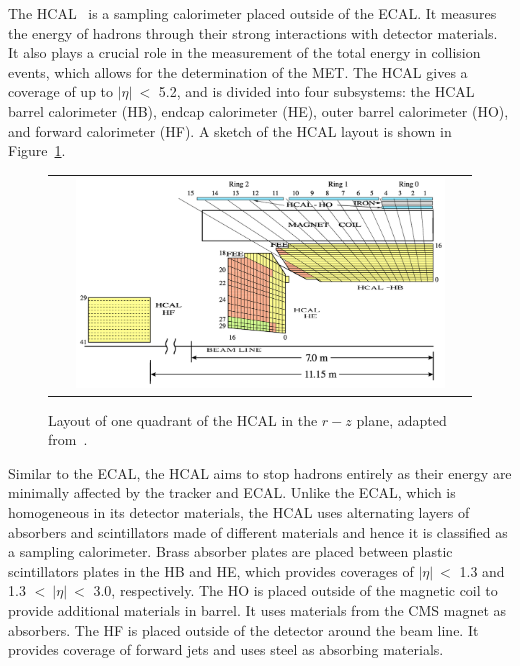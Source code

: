 The \ac{HCAL}~\cite{CMS:1997xji} is a sampling calorimeter placed outside of the \ac{ECAL}. It measures the energy of hadrons through their strong interactions with detector materials. It also plays a crucial role in the measurement of the total energy in collision events, which allows for the determination of the \ac{MET}. The \ac{HCAL} gives a coverage of up to $|\eta|~<$ 5.2, and is divided into four subsystems: the \ac{HCAL} barrel calorimeter (HB), endcap calorimeter (HE), outer barrel calorimeter (HO), and forward calorimeter (HF). A sketch of the \ac{HCAL} layout is shown in Figure~\ref{fig:HCAL}.

\begin{figure}[tbh!]
 \begin{center}
 \begin{tabular}{c}
 \includegraphics[width=0.9\textwidth]{figures/Part2/CMS/HCAL}
 \end{tabular}
 \caption{Layout of one quadrant of the \ac{HCAL} in the $r-z$ plane, adapted from~\cite{CMS:2009nwd}.}
 \label{fig:HCAL}
 \end{center}
\end{figure}

Similar to the \ac{ECAL}, the \ac{HCAL} aims to stop hadrons entirely as their energy are minimally affected by the tracker and \ac{ECAL}. Unlike the \ac{ECAL}, which is homogeneous in its detector materials, the \ac{HCAL} uses alternating layers of absorbers and scintillators made of different materials and hence it is classified as a sampling calorimeter. Brass absorber plates are placed between plastic scintillators plates in the HB and HE, which provides coverages of $|\eta|~<$ 1.3 and 1.3 $<~|\eta|~<$ 3.0, respectively. The HO is placed outside of the magnetic coil to provide additional materials in barrel. It uses materials from the \ac{CMS} magnet as absorbers. The HF is placed outside of the detector around the beam line. It provides coverage of forward jets and uses steel as absorbing materials. 

